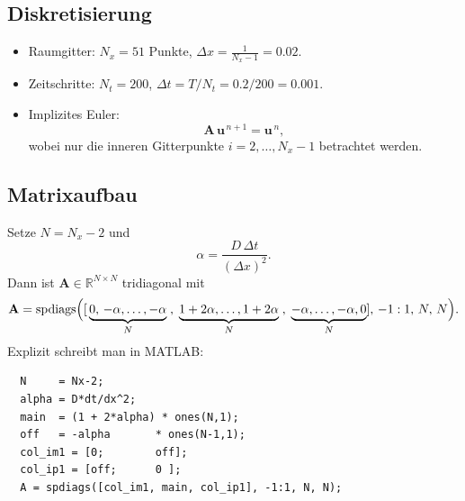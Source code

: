 \documentclass{scrartcl}
\begin{document}
\subsection*{Diskretisierung}
\begin{itemize}
  \item Raumgitter: $N_x=51$ Punkte, \quad $\Delta x = \tfrac{1}{N_x-1}=0.02$.
  \item Zeitschritte: $N_t=200$, \quad $\Delta t = T/N_t=0.2/200=0.001$.
  \item Implizites Euler: 
    \[
      \mathbf{A}\,\mathbf{u}^{\,n+1}
      = \mathbf{u}^{\,n},
    \]
    wobei nur die inneren Gitterpunkte $i=2,\dots,N_x-1$ betrachtet werden.
\end{itemize}

\subsection*{Matrixaufbau}
Setze $N=N_x-2$ und
\[
\alpha = \frac{D\,\Delta t}{(\Delta x)^2}.
\]
Dann ist $\mathbf{A}\in\mathbb{R}^{N\times N}$ tridiagonal mit
\[
\mathbf{A} = \mathrm{spdiags}\Bigl([\,
\underbrace{0,\,-\alpha,\dots,-\alpha}_{N}\;,\;
\underbrace{1+2\alpha,\dots,1+2\alpha}_{N}\;,\;
\underbrace{-\alpha,\dots,-\alpha,0}_{N}
],\,-1:1,\,N,\,N\Bigr).
\]
Explizit schreibt man in MATLAB:
\begin{verbatim}
  N     = Nx-2;
  alpha = D*dt/dx^2;
  main  = (1 + 2*alpha) * ones(N,1);
  off   = -alpha       * ones(N-1,1);
  col_im1 = [0;        off];
  col_ip1 = [off;      0 ];
  A = spdiags([col_im1, main, col_ip1], -1:1, N, N);
\end{verbatim}
\end{document}

